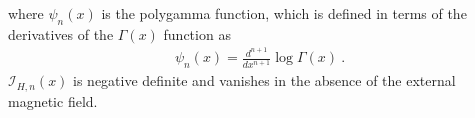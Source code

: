 \documentclass[12pt]{elsarticle}
\begin{document}
where $\psi_{n}(x)$ is the polygamma function, which is defined in terms of the derivatives of the $\Gamma(x)$ function as
\begin{align}
\psi_{n}(x)=\frac{d^{n+1}}{dx^{n+1}}\log\Gamma(x)\ .
\end{align}
$\mathcal{I}_{H,n}(x)$ is negative definite and vanishes in the absence of the external magnetic field.
\end{document}
